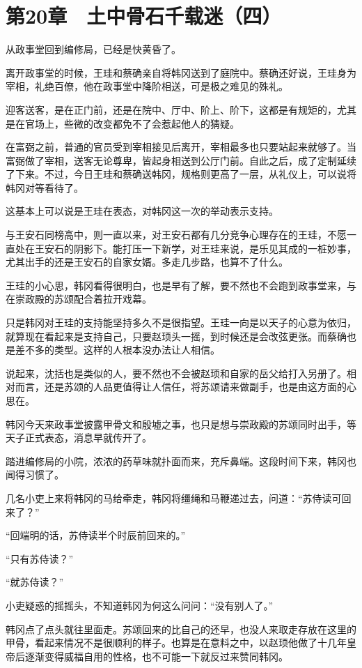 \section{第20章　土中骨石千载迷（四）}

从政事堂回到编修局，已经是快黄昏了。

离开政事堂的时候，王珪和蔡确亲自将韩冈送到了庭院中。蔡确还好说，王珪身为宰相，礼绝百僚，他在政事堂中降阶相送，可是极之难见的殊礼。

迎客送客，是在正门前，还是在院中、厅中、阶上、阶下，这都是有规矩的，尤其是在官场上，些微的改变都免不了会惹起他人的猜疑。

在富弼之前，普通的官员受到宰相接见后离开，宰相最多也只要站起来就够了。当富弼做了宰相，送客无论尊卑，皆起身相送到公厅门前。自此之后，成了定制延续了下来。不过，今日王珪和蔡确送韩冈，规格则更高了一层，从礼仪上，可以说将韩冈对等看待了。

这基本上可以说是王珪在表态，对韩冈这一次的举动表示支持。

与王安石同榜高中，则一直以来，对王安石都有几分竞争心理存在的王珪，不愿一直处在王安石的阴影下。能打压一下新学，对王珪来说，是乐见其成的一桩妙事，尤其出手的还是王安石的自家女婿。多走几步路，也算不了什么。

王珪的小心思，韩冈看得很明白，也是早有了解，要不然也不会跑到政事堂来，与在崇政殿的苏颂配合着拉开戏幕。

只是韩冈对王珪的支持能坚持多久不是很指望。王珪一向是以天子的心意为依归，就算现在看起来是支持自己，只要赵顼头一摇，到时候还是会改弦更张。而蔡确也是差不多的类型。这样的人根本没办法让人相信。

说起来，沈括也是类似的人，要不然也不会被赵顼和自家的岳父给打入另册了。相对而言，还是苏颂的人品更值得让人信任，将苏颂请来做副手，也是由这方面的心思在。

韩冈今天来政事堂披露甲骨文和殷墟之事，也只是想与崇政殿的苏颂同时出手，等天子正式表态，消息早就传开了。

踏进编修局的小院，浓浓的药草味就扑面而来，充斥鼻端。这段时间下来，韩冈也闻得习惯了。

几名小吏上来将韩冈的马给牵走，韩冈将缰绳和马鞭递过去，问道：“苏侍读可回来了？”

“回端明的话，苏侍读半个时辰前回来的。”

“只有苏侍读？”

“就苏侍读？”

小吏疑惑的摇摇头，不知道韩冈为何这么问问：“没有别人了。”

韩冈点了点头就往里面走。苏颂回来的比自己的还早，也没人来取走存放在这里的甲骨，看起来情况不是很顺利的样子。也算是在意料之中，以赵顼他做了十几年皇帝后逐渐变得威福自用的性格，也不可能一下就反过来赞同韩冈。

